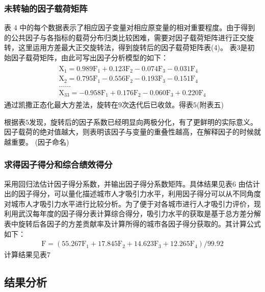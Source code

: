 \documentclass{whutmod}
\begin{document}
	\subsubsection{未转轴的因子载荷矩阵}
	表 4 中的每个数据表示了相应因子变量对相应原变量的相对重要程度。由于得到的公共因子与各指标的载荷分布归类比较困难，需要对因子载荷矩阵进行正交旋转，这里运用方差最大正交旋转法，得到旋转后的因子载荷矩阵表(4)。
	表$3$是初始因子载荷矩阵，由此可写出因子分析模型的如下：
	\begin{gather}
	\begin{array} { l } { \mathrm { X } _ { 1 } = 0.989 \mathrm { F } _ { 1 } + 0.123 \mathrm { F } _ { 2 } - 0.074 \mathrm { F } _ { 3 } - 0.031 \mathrm { F } _ { 4 } } \\ { \mathrm { X } _ { 2 } = 0.795 \mathrm { F } _ { 1 } - 0.556 \mathrm { F } _ { 2 } - 0.193 \mathrm { F } _ { 3 } - 0.151 \mathrm { F } _ { 4 } } \\ { \ldots \ldots } \\ { \mathrm { X } _ { 33 } = - 0.958 \mathrm { F } _ { 1 } + 0.176 \mathrm { F } _ { 2 } - 0.060 \mathrm { F } _ { 3 } + 0.220 \mathrm { F } _ { 4 } } \end{array}
	\end{gather}
	通过凯撒正态化最大方差法，旋转在$9$次迭代后已收敛。得表$5$(附表五)
	
	根据表$5$发现，旋转后的因子系数已经明显向两极分化，有了更鲜明的实际意义。因子载荷的绝对值越大，则表明该因子与变量的重叠性越高，在解释因子的时候就越重要。
	(因子命名)
	\subsubsection{求得因子得分和综合绩效得分}
	采用回归法估计因子得分系数，并输出因子得分系数矩阵。具体结果见表$6$
	由估计出的因子得分，可以量化描述城市人才吸引力水平，利用因子得分可以从不同角度对城市人才吸引力水平进行比较分析。为了便于对各城市进行人才吸引力评价，现利用武汉每年度的因子得分表计算综合得分，吸引力水平的获取是基于总方差分解表中旋转后各因子的方差贡献率及计算所得的城市各因子得分获取的。其计算公式如下：
	\begin{gather}
	\mathrm { F } = \left( 55.267 \mathrm { F } _ { 1 } + 17.845 \mathrm { F } _ { 2 } + 14.623 \mathrm { F } _ { 3 } + 12.265 \mathrm { F } _ { 4 } \right) / 99.92
	\end{gather}
	计算结果见表$7$
	\subsection{结果分析}
	
\end{document}
